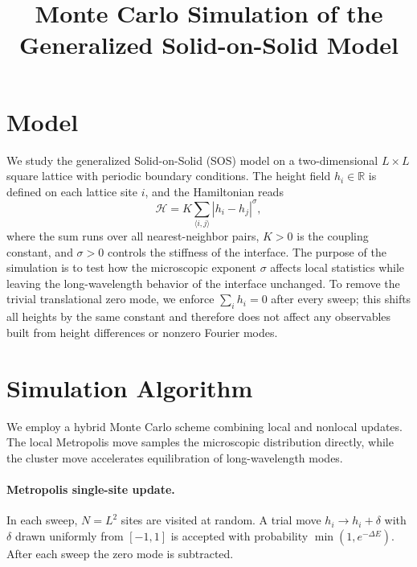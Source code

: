 \documentclass[11pt,a4paper]{article}
\title{Monte Carlo Simulation of the Generalized Solid-on-Solid Model}
\author{}
\date{}
\begin{document}
\maketitle

\section{Model}

We study the generalized Solid-on-Solid (SOS) model on a two-dimensional
$L\times L$ square lattice with periodic boundary conditions.
The height field $h_i\in\mathbb{R}$ is defined on each lattice site $i$,
and the Hamiltonian reads
\begin{equation}
  \mathcal{H} = K \sum_{\langle i,j\rangle} |h_i - h_j|^{\sigma},
\end{equation}
where the sum runs over all nearest-neighbor pairs, $K>0$ is the coupling
constant, and $\sigma>0$ controls the stiffness of the interface.
The purpose of the simulation is to test how the microscopic exponent
$\sigma$ affects local statistics while leaving the long-wavelength behavior
of the interface unchanged. To remove the trivial translational zero mode,
we enforce $\sum_i h_i = 0$ after every sweep; this shifts all heights by the
same constant and therefore does not affect any observables built from height
differences or nonzero Fourier modes.

\section{Simulation Algorithm}

We employ a hybrid Monte Carlo scheme combining local and nonlocal updates.
The local Metropolis move samples the microscopic distribution directly,
while the cluster move accelerates equilibration of long-wavelength modes.

\paragraph{Metropolis single-site update.}
In each sweep, $N=L^2$ sites are visited at random.
A trial move $h_i \to h_i + \delta$ with $\delta$ drawn uniformly from
$[-1,1]$ is accepted with probability $\min(1, e^{-\Delta E})$.
After each sweep the zero mode is subtracted.
\end{document}
